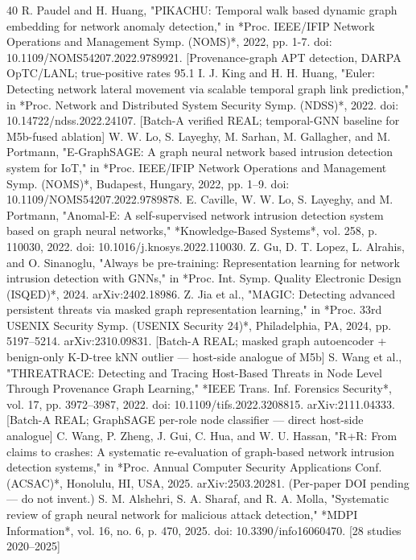 \begin{thebibliography}{40}
 R. Paudel and H. Huang, "PIKACHU: Temporal walk based dynamic graph embedding for network anomaly detection," in *Proc. IEEE/IFIP Network Operations and Management Symp. (NOMS)*, 2022, pp. 1-7. doi: 10.1109/NOMS54207.2022.9789921. [Provenance-graph APT detection, DARPA OpTC/LANL; true-positive rates 95.1%
 I. J. King and H. H. Huang, "Euler: Detecting network lateral movement via scalable temporal graph link prediction," in *Proc. Network and Distributed System Security Symp. (NDSS)*, 2022. doi: 10.14722/ndss.2022.24107. [Batch-A verified REAL; temporal-GNN baseline for M5b-fused ablation]
 W. W. Lo, S. Layeghy, M. Sarhan, M. Gallagher, and M. Portmann, "E-GraphSAGE: A graph neural network based intrusion detection system for IoT," in *Proc. IEEE/IFIP Network Operations and Management Symp. (NOMS)*, Budapest, Hungary, 2022, pp. 1–9. doi: 10.1109/NOMS54207.2022.9789878.
 E. Caville, W. W. Lo, S. Layeghy, and M. Portmann, "Anomal-E: A self-supervised network intrusion detection system based on graph neural networks," *Knowledge-Based Systems*, vol. 258, p. 110030, 2022. doi: 10.1016/j.knosys.2022.110030.
 Z. Gu, D. T. Lopez, L. Alrahis, and O. Sinanoglu, "Always be pre-training: Representation learning for network intrusion detection with GNNs," in *Proc. Int. Symp. Quality Electronic Design (ISQED)*, 2024. arXiv:2402.18986.
 Z. Jia et al., "MAGIC: Detecting advanced persistent threats via masked graph representation learning," in *Proc. 33rd USENIX Security Symp. (USENIX Security 24)*, Philadelphia, PA, 2024, pp. 5197–5214. arXiv:2310.09831. [Batch-A REAL; masked graph autoencoder + benign-only K-D-tree kNN outlier — host-side analogue of M5b]
 S. Wang et al., "THREATRACE: Detecting and Tracing Host-Based Threats in Node Level Through Provenance Graph Learning," *IEEE Trans. Inf. Forensics Security*, vol. 17, pp. 3972–3987, 2022. doi: 10.1109/tifs.2022.3208815. arXiv:2111.04333. [Batch-A REAL; GraphSAGE per-role node classifier — direct host-side analogue]
 C. Wang, P. Zheng, J. Gui, C. Hua, and W. U. Hassan, "R+R: From claims to crashes: A systematic re-evaluation of graph-based network intrusion detection systems," in *Proc. Annual Computer Security Applications Conf. (ACSAC)*, Honolulu, HI, USA, 2025. arXiv:2503.20281. (Per-paper DOI pending — do not invent.)
 S. M. Alshehri, S. A. Sharaf, and R. A. Molla, "Systematic review of graph neural network for malicious attack detection," *MDPI Information*, vol. 16, no. 6, p. 470, 2025. doi: 10.3390/info16060470. [28 studies 2020–2025]

\end{thebibliography}

